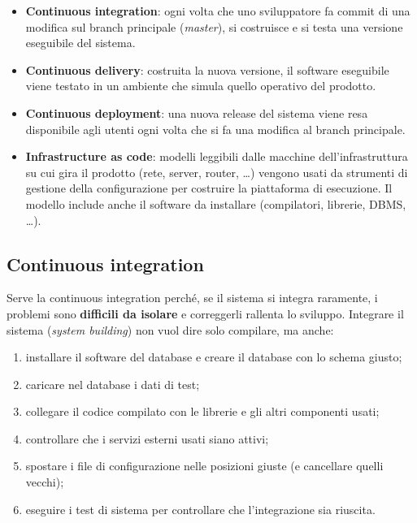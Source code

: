 \begin{itemize}
\tightlist
\item
  \textbf{Continuous integration}: ogni volta che uno sviluppatore fa
  commit di una modifica sul branch principale (\emph{master}), si
  costruisce e si testa una versione eseguibile del sistema.
\item
  \textbf{Continuous delivery}: costruita la nuova versione, il software
  eseguibile viene testato in un ambiente che simula quello operativo
  del prodotto.
\item
  \textbf{Continuous deployment}: una nuova release del sistema viene
  resa disponibile agli utenti ogni volta che si fa una modifica al
  branch principale.
\item
  \textbf{Infrastructure as code}: modelli leggibili dalle macchine
  dell'infrastruttura su cui gira il prodotto (rete, server, router,
  \ldots) vengono usati da strumenti di gestione della configurazione
  per costruire la piattaforma di esecuzione. Il modello include anche
  il software da installare (compilatori, librerie, DBMS, \ldots).
\end{itemize}

\subsection{Continuous integration}\label{continuous-integration}

Serve la continuous integration perché, se il sistema si integra
raramente, i problemi sono \textbf{difficili da isolare} e correggerli
rallenta lo sviluppo. Integrare il sistema (\emph{system building}) non
vuol dire solo compilare, ma anche:

\begin{enumerate}
\def\labelenumi{\arabic{enumi}.}
\tightlist
\item
  installare il software del database e creare il database con lo schema
  giusto;
\item
  caricare nel database i dati di test;
\item
  collegare il codice compilato con le librerie e gli altri componenti
  usati;
\item
  controllare che i servizi esterni usati siano attivi;
\item
  spostare i file di configurazione nelle posizioni giuste (e cancellare
  quelli vecchi);
\item
  eseguire i test di sistema per controllare che l'integrazione sia
  riuscita.
\end{enumerate}

